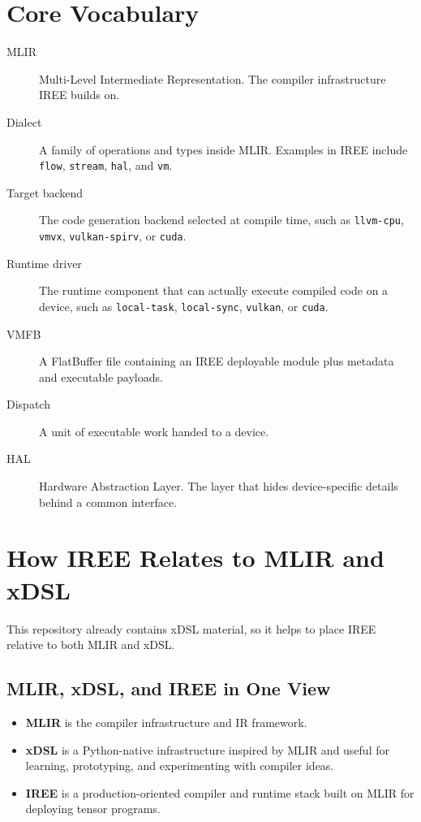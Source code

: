 \documentclass[11pt,a4paper]{article}
\begin{document}
\section{Core Vocabulary}

\begin{description}
    \item[MLIR] Multi-Level Intermediate Representation. The compiler infrastructure IREE builds on.
    \item[Dialect] A family of operations and types inside MLIR. Examples in IREE include \texttt{flow}, \texttt{stream}, \texttt{hal}, and \texttt{vm}.
    \item[Target backend] The code generation backend selected at compile time, such as \texttt{llvm-cpu}, \texttt{vmvx}, \texttt{vulkan-spirv}, or \texttt{cuda}.
    \item[Runtime driver] The runtime component that can actually execute compiled code on a device, such as \texttt{local-task}, \texttt{local-sync}, \texttt{vulkan}, or \texttt{cuda}.
    \item[VMFB] A FlatBuffer file containing an IREE deployable module plus metadata and executable payloads.
    \item[Dispatch] A unit of executable work handed to a device.
    \item[HAL] Hardware Abstraction Layer. The layer that hides device-specific details behind a common interface.
\end{description}

\section{How IREE Relates to MLIR and xDSL}

This repository already contains xDSL material, so it helps to place IREE relative to both MLIR and xDSL.

\subsection{MLIR, xDSL, and IREE in One View}

\begin{itemize}
    \item \textbf{MLIR} is the compiler infrastructure and IR framework.
    \item \textbf{xDSL} is a Python-native infrastructure inspired by MLIR and useful for learning, prototyping, and experimenting with compiler ideas.
    \item \textbf{IREE} is a production-oriented compiler and runtime stack built on MLIR for deploying tensor programs.
\end{itemize}
\end{document}
